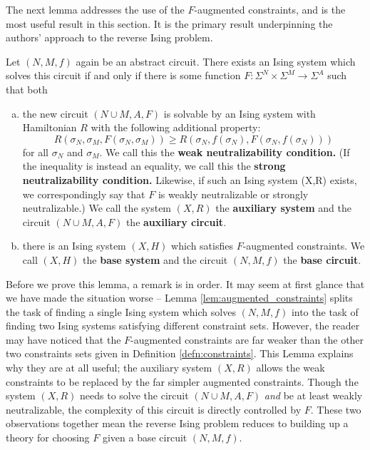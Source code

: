 \documentclass{article}
\begin{document}
The next lemma addresses the use of the $F$-augmented constraints, and is the most useful result in this section. It is the primary result underpinning the authors' approach to the reverse Ising problem.
\begin{lem}\label{lem:augmented_constraints}
  Let $(N, M, f)$ again be an abstract circuit. There exists an Ising system which solves this circuit if and only if there is some function $F:\Sigma^N\times\Sigma^M \to \Sigma^A$ such that both
  \begin{enumerate}[(a)]
    \item the new circuit $(N\cup M, A, F)$ is solvable by an Ising system with Hamiltonian $R$ with the following additional property:
      \begin{equation}\label{eqn:weak-neutralizability}\tag{$\dagger$}
        R(\sigma_N, \sigma_M, F(\sigma_N,\sigma_M)) \geq R(\sigma_N, f(\sigma_N), F(\sigma_N, f(\sigma_N)))
      \end{equation}
      for all $\sigma_N$ and $\sigma_M$. We call this the \textbf{weak neutralizability condition.} (If the inequality is instead an equality, we call this the \textbf{strong neutralizability condition.} Likewise, if such an Ising system (X,R) exists, we correspondingly say that $F$ is weakly neutralizable or strongly neutralizable.) We call the system $(X, R)$ the \textbf{auxiliary system} and the circuit $(N\cup M, A, F)$ the \textbf{auxiliary circuit}.
    \item there is an Ising system $(X, H)$ which satisfies $F$-augmented constraints. We call $(X,H)$ the \textbf{base system} and the circuit $(N,M,f)$ the \textbf{base circuit}.
  \end{enumerate} 
\end{lem}
\begin{rmk}\label{rmk:auxiliary_system_role}
  Before we prove this lemma, a remark is in order. It may seem at first glance that we have made the situation worse -- Lemma \ref{lem:augmented_constraints} splits the task of finding a single Ising system which solves $(N,M,f)$ into the task of finding two Ising systems satisfying different constraint sets. However, the reader may have noticed that the $F$-augmented constraints are far weaker than the other two constraints sets given in Definition \ref{defn:constraints}. This Lemma explains why they are at all useful; the auxiliary system $(X,R)$ allows the weak constraints to be replaced by the far simpler augmented constraints. Though the system $(X,R)$ needs to solve the circuit $(N\cup M, A,F)$ \emph{and} be at least weakly neutralizable, the complexity of this circuit is directly controlled by $F$. These two observations together mean the reverse Ising problem reduces to building up a theory for choosing $F$ given a base circuit $(N,M,f)$.
\end{rmk}
\end{document}
